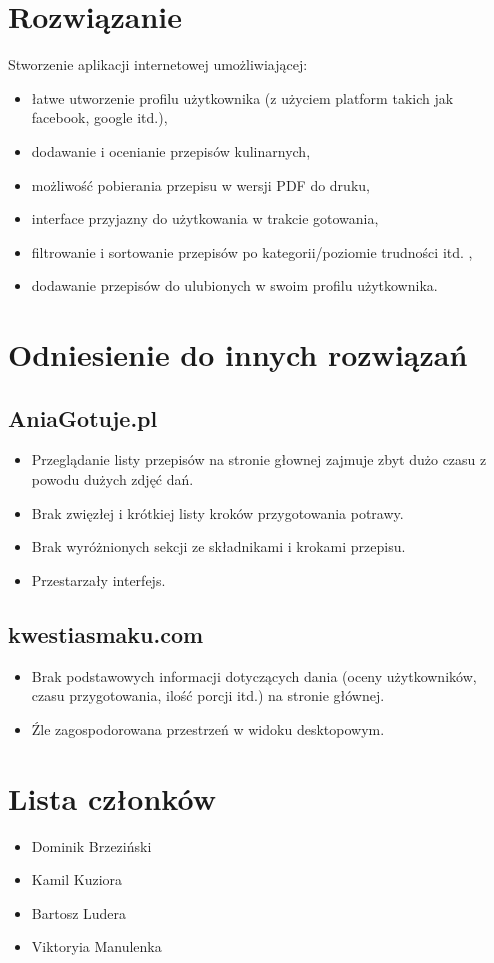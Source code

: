 \documentclass{article}
\begin{document}
\section{Rozwiązanie}
Stworzenie aplikacji internetowej umożliwiającej:
\begin{itemize}
    \item łatwe utworzenie profilu użytkownika (z użyciem platform takich jak facebook, google itd.),
    \item dodawanie i ocenianie przepisów kulinarnych,
    \item możliwość pobierania przepisu w wersji PDF do druku,
    \item interface przyjazny do użytkowania w trakcie gotowania,
    \item filtrowanie i sortowanie przepisów po kategorii/poziomie trudności itd. ,
    \item dodawanie przepisów do ulubionych w swoim profilu użytkownika.
\end{itemize}

\section{Odniesienie do innych rozwiązań}
\subsection{AniaGotuje.pl}
\begin{itemize}
    \item Przeglądanie listy przepisów na stronie głownej zajmuje zbyt dużo czasu z powodu dużych zdjęć dań.
    \item Brak zwięzłej i krótkiej listy kroków przygotowania potrawy.
    \item Brak wyróżnionych sekcji ze składnikami i krokami przepisu.
    \item Przestarzały interfejs.
\end{itemize}
\subsection{kwestiasmaku.com}
\begin{itemize}
    \item Brak podstawowych informacji dotyczących dania (oceny użytkowników, czasu przygotowania, ilość porcji itd.) na stronie głównej.
    \item Źle zagospodorowana przestrzeń w widoku desktopowym.
\end{itemize}
\section{Lista członków}
\begin{itemize}
    \item Dominik Brzeziński
    \item Kamil Kuziora
    \item Bartosz Ludera
    \item Viktoryia Manulenka
\end{itemize}
\end{document}
